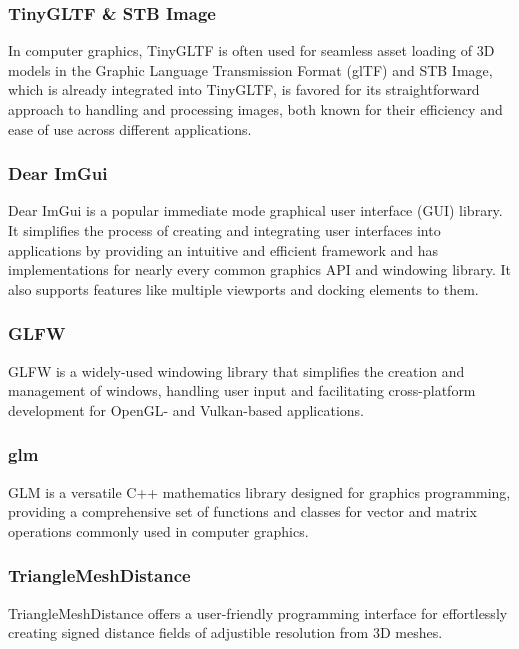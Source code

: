 \documentclass[intern]{cgMA}
\begin{document}
    \subsubsection*{TinyGLTF \& STB Image}  
    In computer graphics, TinyGLTF \cite{tinygltf} is often used for seamless asset loading of 3D models in the Graphic Language Transmission Format (glTF) and STB Image, which is already integrated into TinyGLTF, is favored for its straightforward approach to handling and processing images, both known for their efficiency and ease of use across different applications.

    \subsubsection*{Dear ImGui}
    Dear ImGui\cite{imgui} is a popular immediate mode graphical user interface (GUI) library. It simplifies the process of creating and integrating user interfaces into applications by providing an intuitive and efficient framework and has implementations for nearly every common graphics API and windowing library. It also supports features like multiple viewports and docking elements to them.

    \subsubsection*{GLFW}
    GLFW \cite{glfw} is a widely-used windowing library that simplifies the creation and management of windows, handling user input and facilitating cross-platform development for OpenGL- and Vulkan-based applications.

    \subsubsection*{glm}
    GLM \cite{glm} is a versatile C++ mathematics library designed for graphics programming, providing a comprehensive set of functions and classes for vector and matrix operations commonly used in computer graphics.

    \subsubsection*{TriangleMeshDistance}
    TriangleMeshDistance \cite{trianglemeshdistance} offers a user-friendly programming interface for effortlessly creating signed distance fields of adjustible resolution from 3D meshes. 

    \pagebreak
\end{document}
